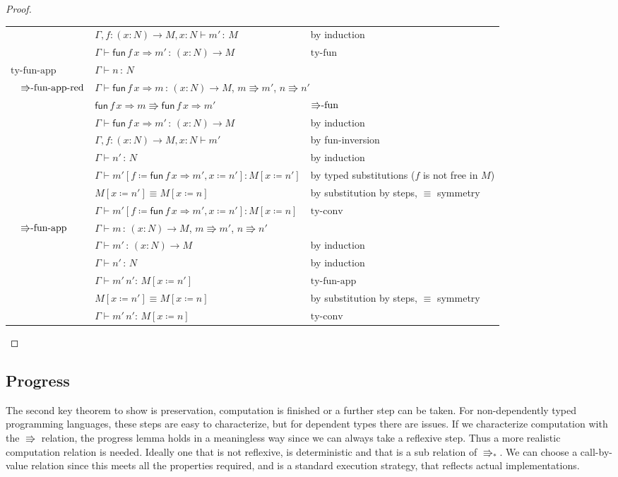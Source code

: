 \begin{proof}
\begin{tabular}{llll}
 &  & $\Gamma,f:\left(x:N\right)\rightarrow M,x:N\vdash m'\,:\,M$ & by induction \tabularnewline
 &  & $\Gamma\vdash\mathsf{fun}\,f\,x\Rightarrow m'\,:\,\left(x:N\right)\rightarrow M$ & $\textrm{ty-fun}$\tabularnewline
\multicolumn{2}{l}{$\textrm{ty-fun-app}$} & $\Gamma\vdash n\,:\,N$ & \tabularnewline
 & $\textrm{\ensuremath{\Rrightarrow}-fun-app-red}$ & \multicolumn{2}{l}{$\Gamma\vdash\mathsf{fun}\,f\,x\Rightarrow m\,:\,\left(x:N\right)\rightarrow M$,
$m\Rrightarrow m'$, $n\Rrightarrow n'$}\tabularnewline
 &  & $\mathsf{fun}\,f\,x\Rightarrow m\Rrightarrow\mathsf{fun}\,f\,x\Rightarrow m'$ & $\textrm{\ensuremath{\Rrightarrow}-fun}$\tabularnewline
 &  & $\Gamma\vdash\mathsf{fun}\,f\,x\Rightarrow m'\,:\,\left(x:N\right)\rightarrow M$ & by induction\tabularnewline
 &  & $\Gamma,f:\left(x:N\right)\rightarrow M,x:N\vdash m'$ & by fun-inversion\tabularnewline
 &  & $\Gamma\vdash n'\,:\,N$ & by induction\tabularnewline
 &  & $\Gamma\vdash m'\left[f\coloneqq\mathsf{fun}\,f\,x\Rightarrow m',x\coloneqq n'\right]:M\left[x\coloneqq n'\right]$ & by typed substitutions ($f$ is not free in $M$)\tabularnewline
 &  & $M\left[x\coloneqq n'\right]\equiv M\left[x\coloneqq n\right]$ & by substitution by steps, $\equiv$ symmetry\tabularnewline
 &  & $\Gamma\vdash m'\left[f\coloneqq\mathsf{fun}\,f\,x\Rightarrow m',x\coloneqq n'\right]:M\left[x\coloneqq n\right]$ & $\textrm{ty-conv}$\tabularnewline
 & $\textrm{\ensuremath{\Rrightarrow}-fun-app}$ & $\Gamma\vdash m\,:\,\left(x:N\right)\rightarrow M$, $m\Rrightarrow m'$,
$n\Rrightarrow n'$ & \tabularnewline
 &  & $\Gamma\vdash m'\,:\,\left(x:N\right)\rightarrow M$ & by induction\tabularnewline
 &  & $\Gamma\vdash n'\,:\,N$ & by induction\tabularnewline
 &  & $\Gamma\vdash m'\,n':\,M\left[x\coloneqq n'\right]$ & $\textrm{ty-fun-app}$\tabularnewline
 &  & $M\left[x\coloneqq n'\right]\equiv M\left[x\coloneqq n\right]$ & by substitution by steps, $\equiv$ symmetry\tabularnewline
 &  & $\Gamma\vdash m'\,n':\,M\left[x\coloneqq n\right]$ & $\textrm{ty-conv}$\tabularnewline
\end{tabular}
\end{proof}

\subsection{Progress}

The second key theorem to show is preservation, computation is finished
or a further step can be taken. For non-dependently typed programming
languages, these steps are easy to characterize, but for dependent
types there are issues. If we characterize computation with the $\Rrightarrow$
relation, the progress lemma holds in a meaningless way since we can
always take a reflexive step. Thus a more realistic computation relation
is needed. Ideally one that is not reflexive, is deterministic and
that is a sub relation of $\Rrightarrow_{*}$. We can choose a call-by-value
relation since this meets all the properties required, and is a standard
execution strategy, that reflects actual implementations. 

